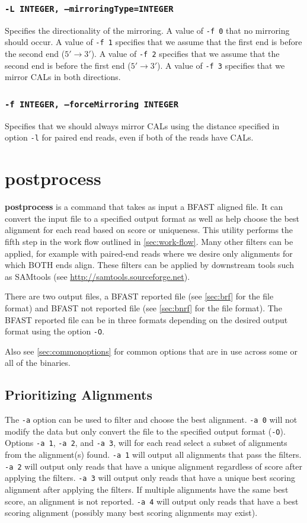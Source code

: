 \documentclass[a4paper,12pt]{book}
\newcommand{\TT}[1]{{\tt #1}} %
\newcommand{\BF}[1]{{\bf #1}} %
\newcommand{\BAF}{BFAST aligned file} %
\newcommand{\BRF}{BFAST reported file} %
\newcommand{\BNRF}{BFAST not reported file} %
\begin{document}
\subsubsection{\TT{-L INTEGER, --mirroringType=INTEGER}}
Specifies the directionality of the mirroring.
A value of \TT{-f 0} that no mirroring should occur.
A value of \TT{-f 1} specifies that we assume that the first end is before the second end ($5'\rightarrow3'$).
A value of \TT{-f 2} specifies that we assume that the second end is before the first end ($5'\rightarrow3'$).
A value of \TT{-f 3} specifies that we mirror CALs in both directions.
\subsubsection{\TT{-f INTEGER, --forceMirroring INTEGER}}
Specifies that we should always mirror CALs using the distance specified in option \TT{-l} for paired end reads, even if both of the reads have CALs.

\section{postprocess}
\label{sec:postprocess}
\BF{postprocess} is a command that takes as input a \BAF{}.
It can convert the input file to a specified output format as well as help choose the best alignment for each read based on score or uniqueness.
This utility performs the fifth step in the work flow outlined in \autoref{sec:work-flow}.
Many other filters can be applied, for example with paired-end reads where we desire only alignments for which BOTH ends align. 
These filters can be applied by downstream tools such as SAMtools (see \url{http://samtools.sourceforge.net}).

There are two output files, a \BRF{} (see \autoref{sec:brf} for the file format) and \BNRF{} (see \autoref{sec:bnrf} for the file format).
The \BRF{} can be in three formats depending on the desired output format using the option \TT{-O}.

Also see \autoref{sec:commonoptions} for common options that are in use across some or all of the binaries.

\subsection{Prioritizing Alignments}
\label{sec:prioritizing-alignments}

The \TT{-a} option can be used to filter and choose the best alignment.
\TT{-a 0} will not modify the data but only convert the file to the specified output format (\TT{-O}).
Options \TT{-a 1}, \TT{-a 2}, and \TT{-a 3}, will for each read select a subset of alignments from the alignment(s) found.
\TT{-a 1} will output all alignments that pass the filters.
\TT{-a 2} will output only reads that have a unique alignment regardless of score after applying the filters.
\TT{-a 3} will output only reads that have a unique best scoring alignment after applying the filters.
If multiple alignments have the same best score, an alignment is not reported.
\TT{-a 4} will output only reads that have a best scoring alignment (possibly many best scoring alignments may exist).
\end{document}
